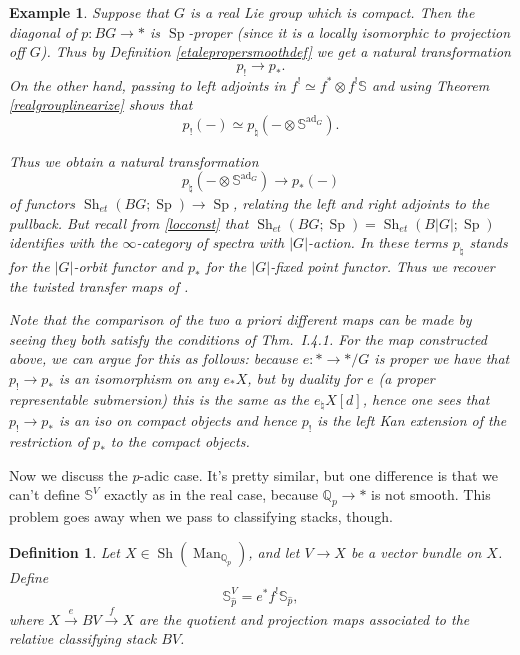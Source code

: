 \documentclass[12pt]{article}
\newtheorem{definition}[theorem]{Definition}
\newtheorem{example}[theorem]{Example}
\newcommand{\on}{\operatorname}
\newcommand{\mbb}{\mathbb}
\newcommand{\wh}{\widehat}
\begin{document}
\begin{example}
Suppose that $G$ is a real Lie group which is \emph{compact}.  Then the diagonal of $p:BG \to \ast$ is $\on{Sp}$-proper (since it is a locally isomorphic to projection off $G$).  Thus by Definition \ref{etalepropersmoothdef} we get a natural transformation
$$p_! \to p_\ast.$$
On the other hand, passing to left adjoints in $f^!\simeq f^\ast \otimes f^!\mbb{S}$ and using Theorem \ref{realgrouplinearize} shows that
$$p_!(-) \simeq p_\natural(- \otimes \mbb{S}^{\on{ad}_G}).$$

Thus we obtain a natural transformation
$$p_\natural(-\otimes \mbb{S}^{\on{ad}_G}) \to p_\ast(-)$$
of functors $\on{Sh}_{et}(BG;\on{Sp})\to \on{Sp}$, relating the left and right adjoints to the pullback.  But recall from \ref{locconst} that $\on{Sh}_{et}(BG;\on{Sp}) = \on{Sh}_{et}(B|G|;\on{Sp})$ identifies with the $\infty$-category of spectra with $|G|$-action.  In these terms $p_\natural$ stands for the $|G|$-orbit functor and $p_\ast $ for the $|G|$-fixed point functor.  Thus we recover the twisted transfer maps of \cite{AdemTransfer}.

Note that the comparison of the two a priori different maps can be made by seeing they both satisfy the conditions of \cite{NikolausTC} Thm.\ I.4.1.  For the map constructed above, we can argue for this as follows:  because $e:\ast \to \ast/G$ is proper we have that $p_!\to p_\ast$ is an isomorphism on any $e_\ast X$, but by duality for $e$ (a proper representable submersion) this is the same as the $e_\natural X[d]$, hence one sees that $p_!\to p_\ast$ is an iso on compact objects and hence $p_!$ is the left Kan extension of the restriction of $p_\ast$ to the compact objects.
\end{example}

Now we discuss the $p$-adic case.  It's pretty similar, but one difference is that we can't define $\mbb{S}^V$ exactly as in the real case, because $\mbb{Q}_p\to \ast$ is not smooth.  This problem goes away when we pass to classifying stacks, though.

\begin{definition}\label{spherefromvb}
Let $X\in \on{Sh}(\on{Man}_{\mbb{Q}_p})$, and let $V\to X$ be a vector bundle on $X$.  Define
$$\mathbb{S}_{\wh{p}}^{V} = e^\ast f^! \mbb{S}_{\wh{p}},$$
where $X\overset{e}{\rightarrow} BV \overset{f}{\rightarrow} X$ are the quotient and projection maps associated to the relative classifying stack $BV$.
\end{definition}
\end{document}
